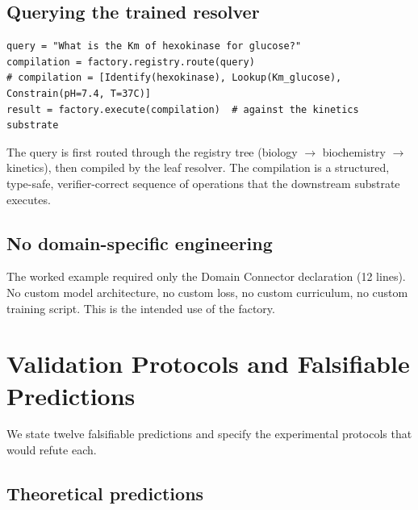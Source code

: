 \documentclass[twocolumn,11pt,a4paper]{article}
\begin{document}
\subsection{Querying the trained resolver}

\begin{verbatim}
query = "What is the Km of hexokinase for glucose?"
compilation = factory.registry.route(query)
# compilation = [Identify(hexokinase), Lookup(Km_glucose), Constrain(pH=7.4, T=37C)]
result = factory.execute(compilation)  # against the kinetics substrate
\end{verbatim}

The query is first routed through the registry tree (biology $\to$ biochemistry $\to$ kinetics), then compiled by the leaf resolver. The compilation is a structured, type-safe, verifier-correct sequence of operations that the downstream substrate executes.

\subsection{No domain-specific engineering}

The worked example required only the Domain Connector declaration (12 lines). No custom model architecture, no custom loss, no custom curriculum, no custom training script. This is the intended use of the factory.


\section{Validation Protocols and Falsifiable Predictions}
\label{sec:predictions}

We state twelve falsifiable predictions and specify the experimental protocols that would refute each.

\subsection{Theoretical predictions}
\end{document}
